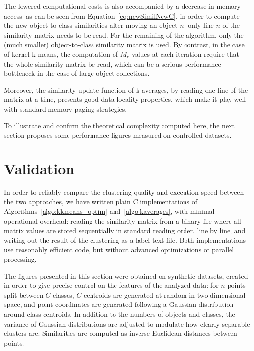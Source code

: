 \documentclass[natbib,smallextended]{svjour3}
\begin{document}
The lowered computational costs is also accompanied by a decrease in memory access: as can be seen from Equation~\ref{eq:newSimilNewC}, in order to compute the new object-to-class similarities after moving an object $n$, only line $n$ of the similarity matrix needs to be read. For the remaining of the algorithm, only the (much smaller) object-to-class similarity matrix is used. By contrast, in the case of kernel k-means, the computation of $M_c$ values at each iteration require that the whole similarity matrix be read, which can be a serious performance bottleneck in the case of large object collections.

Moreover, the similarity update function of k-averages, by reading one line of the matrix at a time, presents good data locality properties, which make it play well with standard memory paging strategies.

To illustrate and confirm the theoretical complexity computed here, the next section proposes some performance figures measured on controlled datasets.

\section{Validation}
\label{sec:validation}

In order to reliably compare the clustering quality and execution speed between the two approaches, we have written plain C implementations of Algorithms~\ref{algo:kkmeans_optim} and~\ref{algo:kaverages}, with minimal operational overhead: reading the similarity matrix from a binary file where all matrix values are stored sequentially in standard reading order, line by line, and writing out the result of the clustering as a label text file. Both implementations use reasonably efficient code, but without advanced optimizations or parallel processing.	%

The figures presented in this section were obtained on synthetic datasets, created in order to give precise control on the features of the analyzed data: for $n$ points split between $C$ classes, $C$ centroids are generated at random in two dimensional space, and point coordinates are generated following a Gaussian distribution around class centroids. In addition to the numbers of objects and classes, the variance of Gaussian distributions are adjusted to modulate how clearly separable clusters are. Similarities are computed as inverse Euclidean distances between points. %
\end{document}

